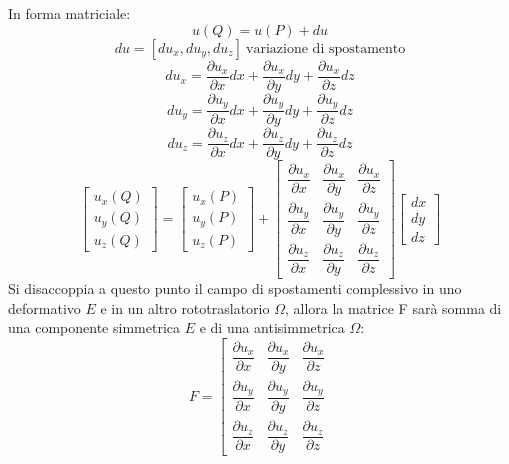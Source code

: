 \documentclass{article}
\begin{document}
\begin{adjustwidth}{2in}{}
	In forma matriciale: 
	\[
	u(Q) = u(P) + du
	\]
	\[
	du = [du_x, du_y, du_z]~\text{variazione di spostamento}
	\]
	\[
	du_x = \frac{\partial u_x}{\partial x} dx + \frac{\partial u_x}{\partial y}dy + \frac{\partial u_x}{\partial z}dz
	\]
	\[
	du_y = \frac{\partial u_y}{\partial x} dx + \frac{\partial u_y}{\partial y}dy + \frac{\partial u_y}{\partial z}dz
	\]
	\[
	du_z = \frac{\partial u_z}{\partial x} dx + \frac{\partial u_z}{\partial y}dy + \frac{\partial u_z}{\partial z}dz
	\]
	\[
		\left[ \begin{array}{c}
			u_x(Q) \\
			u_y(Q) \\
			u_z(Q)
		\end{array}\right] = \left[ \begin{array}{c}
		u_x(P) \\
		u_y(P) \\
		u_z(P)
	\end{array}\right] + \left[\begin{array}{ccc}
	
	\dfrac{\partial u_x}{\partial x} & \dfrac{\partial u_x}{\partial y} & \dfrac{\partial u_x}{\partial z} \\ 
	\dfrac{\partial u_y}{\partial x} & \dfrac{\partial u_y}{\partial y} & \dfrac{\partial u_y}{\partial z} \\ 
	\dfrac{\partial u_z}{\partial x} & \dfrac{\partial u_z}{\partial y} & \dfrac{\partial u_z}{\partial z}
		
	\end{array} \right] \left[ \begin{array}{c}
		dx \\
		dy \\
		dz
	\end{array}\right] 
	\]
	Si disaccoppia a questo punto il campo di spostamenti complessivo in uno deformativo $E$ e in un altro rototraslatorio $\Omega$, allora la matrice F sarà somma di una componente simmetrica $E$ e di una antisimmetrica $\Omega$:	
	\[
	F = \left[\begin{array}{ccc}
		
		\dfrac{\partial u_x}{\partial x} & \dfrac{\partial u_x}{\partial y} & \dfrac{\partial u_x}{\partial z} \\ 
		\dfrac{\partial u_y}{\partial x} & \dfrac{\partial u_y}{\partial y} & \dfrac{\partial u_y}{\partial z} \\ 
		\dfrac{\partial u_z}{\partial x} & \dfrac{\partial u_z}{\partial y} & \dfrac{\partial u_z}{\partial z}
		

\end{array}\]
\end{adjustwidth}
\end{document}
